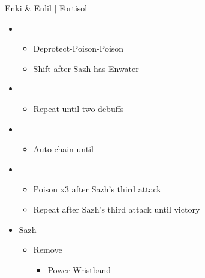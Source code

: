 \begin{battle}{Enki \& Enlil $|$ Fortisol}
\begin{multicols}{2}
\begin{itemize}
    \item \third
    \begin{itemize}
        \item Deprotect-Poison-Poison
        \item Shift after Sazh has Enwater
    \end{itemize}
    \item \fifth
    \begin{itemize}
        \item Repeat until two debuffs
    \end{itemize}
    \item \fourth
    \begin{itemize}
        \item Auto-chain until \stagger
    \end{itemize}
    \item \sixth
    \begin{itemize}
        \item Poison x3 after Sazh's third attack
        \item Repeat after Sazh's third attack until victory
    \end{itemize}
\end{itemize}
\vfill\null
\end{multicols}
\end{battle}
\begin{menu}
\begin{itemize}
    \equip
    \begin{itemize}
        \item Sazh
        \begin{itemize}
            \item Remove
            \begin{itemize}
                \item Power Wristband
            \end{itemize}
        \end{itemize}
    \end{itemize}
\end{itemize}
\end{menu}